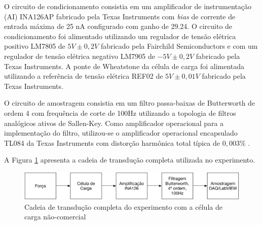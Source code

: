 \documentclass[a4paper]{instrumentacao}
\begin{document}
O circuito de condicionamento consistia em um amplificador de instrumentação (AI) INA126AP fabricado pela Texas Instruments com \textit{bias} de corrente de entrada máxima de 25 nA \cite{datasheet-ina126} configurado com ganho de 29.24. O circuito de condicionamento foi alimentado utilizando um regulador de tensão elétrica positivo LM7805 de $5V \pm 0,2V$ \cite{datasheet-lm7805} fabricado pela Fairchild Semiconductors e com um regulador de tensão elétrica negativo LM7905 de $-5V \pm 0,2V$ \cite{datasheet-lm7905} fabricado pela Texas Instruments. A ponte de Wheatstone da célula de carga foi alimentada utilizando a referência de tensão elétrica REF02 de $5V \pm 0,01V$ \cite{datasheet-ref02} fabricado pela Texas Instruments.

%
%
%
O circuito de amostragem consistia em um filtro passa-baixas de Butterworth de ordem 4 com frequência de corte de 100Hz utilizando a topologia de filtros analógicos ativos de Sallen-Key. Como amplificador operacional para a implementação do filtro, utilizou-se o amplificador operacional encapsulado TL084 da Texas Instruments com distorção harmônica total típica de $0,003\%$ \cite{datasheet-tl084}.

A Figura \ref{fig:celula-nao-comercial-cadeia-transducao} apresenta a cadeia de transdução completa utilizada no experimento.

\begin{figure}[H]
\center
\includegraphics[width=\textwidth]{NaoComercial-Cadeia-Transducao.pdf}
\caption{Cadeia de transdução completa do experimento com a célula de carga não-comercial}
\label{fig:celula-nao-comercial-cadeia-transducao}
\end{figure}
\end{document}
